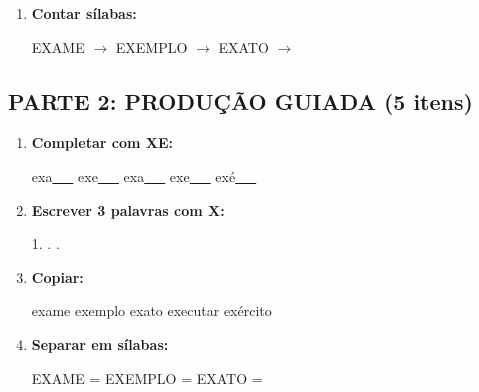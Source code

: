 \begin{exercicio}
\begin{enumerate}
  \item \textbf{Contar sílabas:}
  \begin{center}
  EXAME $\rightarrow$ \underline{\hspace{0.9cm}} \quad EXEMPLO $\rightarrow$ \underline{\hspace{0.9cm}} \quad EXATO $\rightarrow$ \underline{\hspace{0.9cm}}
  \end{center}

\end{enumerate}

\subsection*{PARTE 2: PRODUÇÃO GUIADA (5 itens)}

\begin{enumerate}[resume]

  \item \textbf{Completar com XE:}
  \begin{center}
  exa\underline{~~~} \quad exe\underline{~~~} \quad exa\underline{~~~} \quad exe\underline{~~~} \quad exé\underline{~~~}
  \end{center}

  \item \textbf{Escrever 3 palavras com X:}
  \begin{center}
  1. \underline{\hspace{3cm}} . \underline{\hspace{3cm}} . \underline{\hspace{3cm}}
  \end{center}

  \item \textbf{Copiar:}
  \begin{center}
  exame \quad exemplo \quad exato \quad executar \quad exército
  \end{center}

  \item \textbf{Separar em sílabas:}
  \begin{center}
  EXAME = \underline{\hspace{1cm}} \underline{\hspace{1cm}} \quad EXEMPLO = \underline{\hspace{1cm}} \underline{\hspace{1cm}} \quad EXATO = \underline{\hspace{1cm}} \underline{\hspace{1cm}}
  \end{center}


\end{enumerate}
\end{exercicio}
